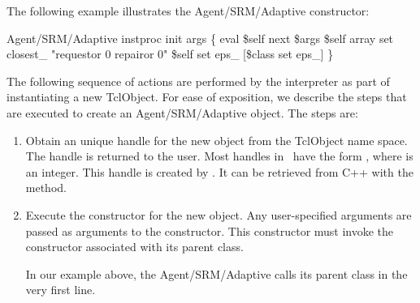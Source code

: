 The following example illustrates the Agent/SRM/Adaptive constructor:
\begin{program}
        Agent/SRM/Adaptive instproc init args \{
                eval \$self next \$args
                \$self array set closest_ "requestor 0 repairor 0"
                \$self set eps_    [\$class set eps_]
        \}
\end{program}

The following sequence of actions are performed by the interpreter
as part of instantiating a new TclObject.
For ease of exposition, we describe the steps that are executed
to create an Agent/SRM/Adaptive object.
The steps are:
\begin{enumerate}
\item
  Obtain an unique handle for the new object   from the TclObject name space.
  The handle is returned to the user.
  Most handles in \ns\ have the form , where 
  is an integer.  This handle is created by
  .
  It can be retrieved from C++ with the
  method.
\item Execute the constructor for the new object.
  Any user-specified arguments are passed as arguments to the constructor.
  This constructor must invoke the constructor
  associated with its parent class.

  In our example above, the Agent/SRM/Adaptive calls its parent class
  in the very first line.  


\end{enumerate}
